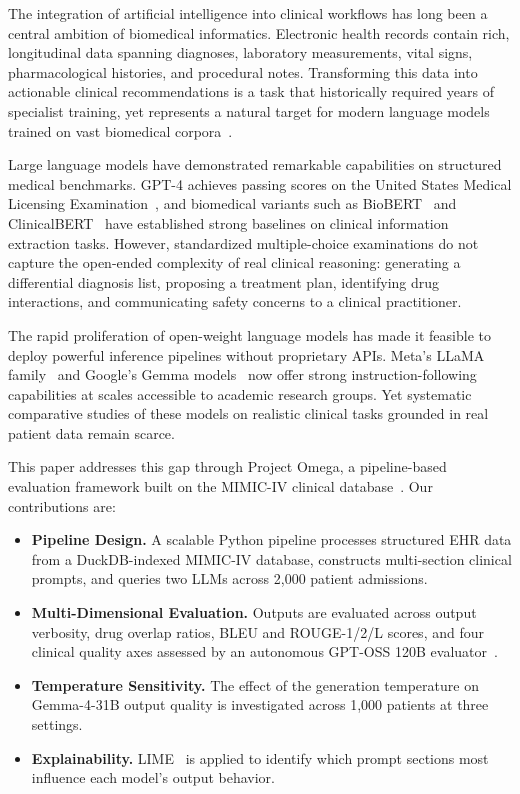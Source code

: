 \documentclass[10pt, twocolumn, a4paper]{article}
\begin{document}
The integration of artificial intelligence into clinical workflows has long been a central ambition of biomedical informatics. Electronic health records contain rich, longitudinal data spanning diagnoses, laboratory measurements, vital signs, pharmacological histories, and procedural notes. Transforming this data into actionable clinical recommendations is a task that historically required years of specialist training, yet represents a natural target for modern language models trained on vast biomedical corpora~\cite{llmclinical}.

Large language models have demonstrated remarkable capabilities on structured medical benchmarks. GPT-4 achieves passing scores on the United States Medical Licensing Examination~\cite{gpt4med}, and biomedical variants such as BioBERT~\cite{biobert} and ClinicalBERT~\cite{clinicalbert} have established strong baselines on clinical information extraction tasks. However, standardized multiple-choice examinations do not capture the open-ended complexity of real clinical reasoning: generating a differential diagnosis list, proposing a treatment plan, identifying drug interactions, and communicating safety concerns to a clinical practitioner.

The rapid proliferation of open-weight language models has made it feasible to deploy powerful inference pipelines without proprietary APIs. Meta's LLaMA family~\cite{llama3} and Google's Gemma models~\cite{gemma} now offer strong instruction-following capabilities at scales accessible to academic research groups. Yet systematic comparative studies of these models on realistic clinical tasks grounded in real patient data remain scarce.

This paper addresses this gap through Project Omega, a pipeline-based evaluation framework built on the MIMIC-IV clinical database~\cite{mimic4}. Our contributions are:

\begin{itemize}
  \item \textbf{Pipeline Design.} A scalable Python pipeline processes structured EHR data from a DuckDB-indexed MIMIC-IV database, constructs multi-section clinical prompts, and queries two LLMs across 2,000 patient admissions.
  \item \textbf{Multi-Dimensional Evaluation.} Outputs are evaluated across output verbosity, drug overlap ratios, BLEU and ROUGE-1/2/L scores, and four clinical quality axes assessed by an autonomous GPT-OSS 120B evaluator~\cite{llmjudge}.
  \item \textbf{Temperature Sensitivity.} The effect of the generation temperature on Gemma-4-31B output quality is investigated across 1,000 patients at three settings.
  \item \textbf{Explainability.} LIME~\cite{lime} is applied to identify which prompt sections most influence each model's output behavior.
\end{itemize}
\end{document}
